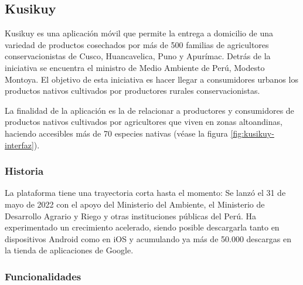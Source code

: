 \subsection{Kusikuy}
Kusikuy es una aplicación móvil que permite la entrega a domicilio de una variedad de productos cosechados por más de 500 familias de agricultores conservacionistas de Cusco, Huancavelica, Puno y Apurímac. Detrás de la iniciativa se encuentra el ministro de Medio Ambiente de Perú, Modesto Montoya. El objetivo de esta iniciativa es hacer llegar a consumidores urbanos los productos nativos cultivados por productores rurales conservacionistas.

La finalidad de la aplicación es la de relacionar a productores y consumidores de productos nativos cultivados por agricultores que viven en zonas altoandinas, haciendo accesibles más de 70 especies nativas (véase la figura \ref{fig:kusikuy-interfaz}).


\subsubsection{Historia}

La plataforma tiene una trayectoria corta hasta el momento: Se lanzó el 31 de mayo de 2022 con el apoyo del Ministerio del Ambiente, el Ministerio de Desarrollo Agrario y Riego y otras instituciones públicas del Perú. Ha experimentado un crecimiento acelerado, siendo posible descargarla tanto en dispositivos Android como en iOS y acumulando ya más de 50.000 descargas en la tienda de aplicaciones de Google.

\subsubsection{Funcionalidades}

